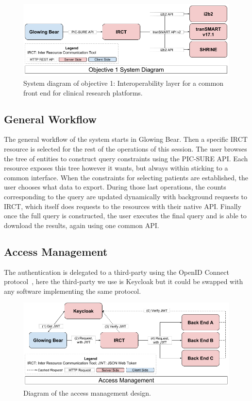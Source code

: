 \begin{figure}[ht]
    \centering
    \includegraphics[width=1\textwidth]{figures/sys_diagram_obj1.png}
    \caption{System diagram of objective 1: Interoperability layer for a common front end for clinical research platforms.}
    \label{fig:sysdiagramobj1}
\end{figure}


\subsection{General Workflow}
The general workflow of the system starts in Glowing Bear.
Then a specific IRCT resource is selected for the rest of the operations of this session.
The user browses the tree of entities to construct query constraints using the PIC-SURE API.
Each resource exposes this tree however it wants, but always within sticking to a common interface.
When the constraints for selecting patients are established, the user chooses what data to export.
During those last operations, the counts corresponding to the query are updated dynamically with background requests to IRCT, which itself does requests to the resources with their native API.
Finally once the full query is constructed, the user executes the final query and is able to download the results, again using one common API.


\subsection{Access Management}

The authentication is delegated to a third-party using the OpenID Connect protocol~\cite{todo}, here the third-party we use is Keycloak but it could be swapped with any software implementing the same protocol.

\begin{figure}[ht]
    \centering
    \includegraphics[width=1\textwidth]{figures/access_mgmt.png}
    \caption{Diagram of the access management design.}
    \label{fig:accessmgmt}
\end{figure}


